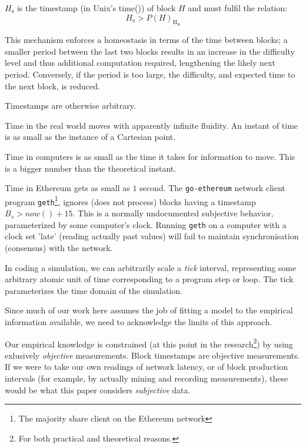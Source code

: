 \documentclass[11pt]{article}
\theoremstyle{plain}
\begin{document}
\hypertarget{block_timestamp_H__s}{}$H_{\mathrm{s}}$ is the timestamp (in 
Unix's time()) of block $H$ and must fulfil the relation:
\begin{equation}
H_{\mathrm{s}} > {P(H)_{\mathrm{H}}}_{\mathrm{s}}
\end{equation}

This mechanism enforces a homeostasis in terms of the time between blocks; a 
smaller period between the last two blocks results in an increase in the 
difficulty level and thus additional computation required, lengthening the 
likely next period. Conversely, if the period is too large, the difficulty, and 
expected time to the next block, is reduced.

Timestamps are otherwise arbitrary.

Time in the real world moves with apparently infinite fluidity. An instant of
time is as small as the instance of a Cartesian point.

Time in computers is as small as the time it takes for information to move.
This is a bigger number than the theoretical instant.

Time in Ethereum gets as small as $1$ second.
The \texttt{go-ethereum} network client program \texttt{geth}\footnote{The 
majority share client on the Ethereum network}, ignores (does not process) 
blocks having a timestamp $B_s > now() + 15$. This is a normally undocumented 
subjective behavior, parameterized by some computer's clock. Running
\texttt{geth} on a computer with a clock set 'late' (reading actually past 
values) will fail to maintain synchronisation (consensus) with the network.

In coding a simulation, we can arbitrarily scale a \textit{tick} interval,
representing some arbitrary atomic unit of time corresponding to a program step 
or loop. The tick parameterizes the time domain of the simulation.

Since much of our work here assumes the job of fitting a model to the empirical
information available, we need to acknowledge the limits of this approach.

Our empirical knowledge is constrained (at this point in the research\footnote{
For both practical and theoretical reasons.}) by using exlusively \emph{
objective} measurements. Block timestamps are objective measurements.
If we were to take our own readings of network latency, or of block production
intervals (for example, by actually mining and recording measurements), these
would be what this paper considers \emph{subjective} data.
\end{document}
